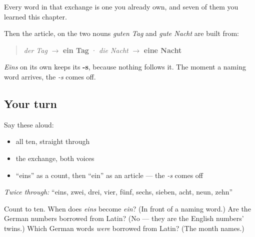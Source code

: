 Every word in that exchange is one you already own, and seven of them you learned this chapter.

Then the article, on the two nouns \emph{guten Tag} and \emph{gute Nacht} are built from:

\begin{quote}
\emph{der Tag} $\to$ \textbf{ein Tag} · \emph{die Nacht} $\to$ \textbf{eine Nacht}
\end{quote}

\emph{Eins} on its own keeps its \textbf{-s}, because nothing follows it. The moment a naming word arrives, the \emph{-s} comes off.

\subsection*{Your turn}
Say these aloud:

\begin{itemize}
\raggedright
  \item all ten, straight through
  \item the exchange, both voices
  \item \textquotedblleft{}eins\textquotedblright{} as a count, then \textquotedblleft{}ein\textquotedblright{} as an article — the \emph{-s} comes off
\end{itemize}

\emph{Twice through:} \textquotedblleft{}eins, zwei, drei, vier, fünf, sechs, sieben, acht, neun, zehn\textquotedblright{}

\begin{tcolorbox}[breakable,colback=teal!4,colframe=teal!35!black,title={Before you move on}]
Count to ten. When does \emph{eins} become \emph{ein}? (In front of a naming word.) Are the German numbers borrowed from Latin? (No — they are the English numbers' twins.) Which German words \emph{were} borrowed from Latin? (The month names.)
\end{tcolorbox}
